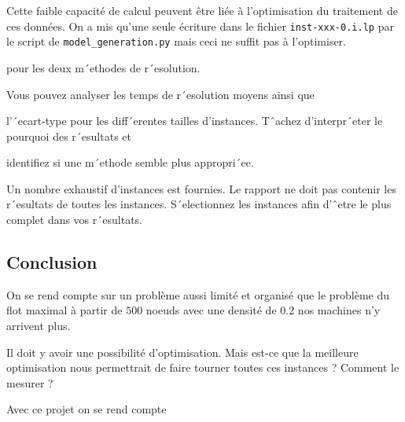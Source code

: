\documentclass{article}[12pt]
\begin{document}
Cette faible capacité de calcul peuvent être liée à l'optimisation du traitement de ces données. On a mis qu'une seule écriture dans le fichier \texttt{inst-xxx-0.i.lp} par le script de \texttt{model\_generation.py} mais ceci ne suffit pas à l'optimiser. 





   pour les deux m´ethodes de r´esolution.

Vous pouvez analyser
   les temps de r´esolution moyens ainsi que

   l’´ecart-type pour les diff´erentes tailles
d’instances.
   Tˆachez d’interpr´eter le pourquoi des r´esultats et

   identifiez si une m´ethode semble plus
appropri´ee.

Un nombre exhaustif d’instances est fournies. Le rapport ne doit pas contenir les r´esultats de toutes
les instances. S´electionnez les instances afin d’ˆetre le plus complet dans vos r´esultats.






    \newpage

    \subsection{Conclusion}
    
    On se rend compte sur un problème aussi limité et organisé que le problème du flot maximal à partir de $500$ noeuds avec une densité de $0.2$  nos machines n'y arrivent plus.
    
    Il doit y avoir une possibilité d'optimisation. Mais est-ce que la meilleure optimisation nous permettrait de faire tourner toutes ces instances ? Comment le mesurer ? 
    
    Avec ce projet on se rend compte 


    \newpage
    
    
\begin{thebibliography}{99}





    


\end{thebibliography}


    

    
\end{document}
